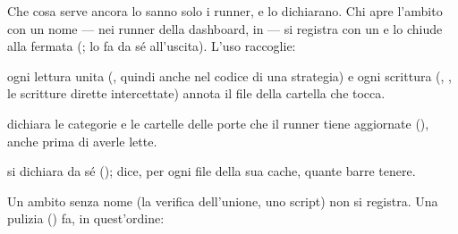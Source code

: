 Che cosa serve ancora lo sanno solo i runner, e lo dichiarano. Chi apre
l'ambito con un nome ---  nei runner
della dashboard,  in
 --- si registra con un  e lo chiude
alla fermata (;  lo fa da sé
all'uscita). L'uso raccoglie:

\begin{description}[leftmargin = 1.4em, style = nextline, itemsep = 4pt]
  \item[I file letti e scritti] ogni lettura unita (,
    quindi anche  nel codice di una strategia) e ogni
    scrittura (, , le scritture
    dirette intercettate) annota il file della cartella che tocca.
  \item[Le cartelle del piano]  dichiara le
    categorie e le cartelle delle porte che il runner tiene aggiornate
    (), anche prima di averle lette.
  \item[I contesti]  si dichiara da sé
    ();  dice, per ogni file
    della sua cache, quante barre tenere.
\end{description}

\noindent
Un ambito senza nome (la verifica dell'unione, uno script) non si registra.
Una pulizia () fa, in quest'ordine:

